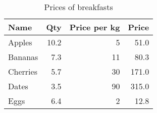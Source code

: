 \documentclass[11pt, a4paper]{article}
\begin{document}
\begin{table}[htb]
    \centering
    \label{tab:ex1}
    \caption{Prices of breakfasts}
    \begin{tabular}{@{}lrrr@{}}
        \toprule
        Name & Qty & Price per kg & Price \\
        \midrule
        Apples & 10.2 & 5 & 51.0 \\
        Bananas & 7.3 & 11 & 80.3 \\
        Cherries & 5.7 & 30 & 171.0 \\
        Dates & 3.5 & 90 & 315.0 \\
        Eggs & 6.4 & 2 & 12.8 \\
        \bottomrule
    \end{tabular}
\end{table}
\end{document}
